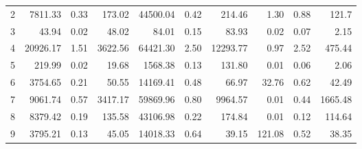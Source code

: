 \begin{table}[ht!]
\begin{tabular}{rrrrrrrrrr}
2                    & 7811.33                                              & 0.33                 & 173.02               & 44500.04                                             & 0.42                 & 214.46               & 1.30                                                     & 0.88                 & 121.7                \\
3                    & 43.94                                                & 0.02                 & 48.02                & 84.01                                                & 0.15                 & 83.93                & 0.02                                                     & 0.07                 & 2.15                 \\
4                    & 20926.17                                             & 1.51                 & 3622.56              & 64421.30                                             & 2.50                 & 12293.77             & 0.97                                                     & 2.52                 & 475.44               \\
5                    & 219.99                                               & 0.02                 & 19.68                & 1568.38                                              & 0.13                 & 131.80               & 0.01                                                     & 0.06                 & 2.06                 \\
6                    & 3754.65                                              & 0.21                 & 50.55                & 14169.41                                             & 0.48                 & 66.97                & 32.76                                                    & 0.62                 & 42.49                \\
7                    & 9061.74                                              & 0.57                 & 3417.17              & 59869.96                                             & 0.80                 & 9964.57              & 0.01                                                     & 0.44                 & 1665.48              \\
8                    & 8379.42                                              & 0.19                 & 135.58               & 43106.98                                             & 0.22                 & 174.84               & 0.01                                                     & 0.12                 & 114.64               \\
9                    & 3795.21                                              & 0.13                 & 45.05                & 14018.33                                             & 0.64                 & 39.15                & 121.08                                                   & 0.52                 & 38.35                \\

\end{tabular}
\end{table}

